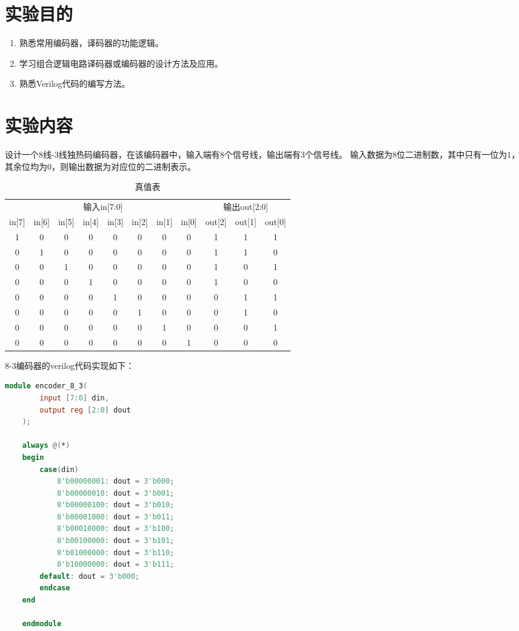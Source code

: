 \documentclass{experiment}
\begin{document}
	\makecover
	\section{实验目的}
		\begin{enumerate}
		\item 熟悉常用编码器，译码器的功能逻辑。
		\item 学习组合逻辑电路译码器或编码器的设计方法及应用。
		\item 熟悉Verilog代码的编写方法。
		\end{enumerate}
	\section{实验内容}
	
	设计一个8线-3线独热码编码器，在该编码器中，输入端有8个信号线，输出端有3个信号线。
	输入数据为8位二进制数，其中只有一位为1，其余位均为0，则输出数据为对应位的二进制表示。
	

	\begin{table}[htbp]
		\centering
		\caption{真值表}
		\begin{tabular}{cccccccc|ccc}
			\toprule
			\multicolumn{8}{c|}{输入in[7:0]} & \multicolumn{3}{c}{输出out[2:0]} \\
			\cmidrule{1-8}\cmidrule{9-11} in[7] & in[6] & in[5] & in[4] & in[3] & in[2] & in[1] & in[0] & out[2] & out[1] & out[0] \\
			\midrule
			1 & 0 & 0 & 0 & 0 & 0 & 0 & 0 & 1 & 1 & 1 \\
			0 & 1 & 0 & 0 & 0 & 0 & 0 & 0 & 1 & 1 & 0 \\
			0 & 0 & 1 & 0 & 0 & 0 & 0 & 0 & 1 & 0 & 1 \\
			0 & 0 & 0 & 1 & 0 & 0 & 0 & 0 & 1 & 0 & 0 \\
			0 & 0 & 0 & 0 & 1 & 0 & 0 & 0 & 0 & 1 & 1 \\
			0 & 0 & 0 & 0 & 0 & 1 & 0 & 0 & 0 & 1 & 0 \\
			0 & 0 & 0 & 0 & 0 & 0 & 1 & 0 & 0 & 0 & 1 \\
			0 & 0 & 0 & 0 & 0 & 0 & 0 & 1 & 0 & 0 & 0 \\
			\bottomrule
		\end{tabular}%
		\label{tab:addlabel}%
	\end{table}%

	8-3编码器的verilog代码实现如下：
\begin{lstlisting}[language=verilog]
	module encoder_8_3(
		input [7:0] din,
		output reg [2:0] dout
	);
	
	always @(*)
	begin
		case(din)
			8'b00000001: dout = 3'b000;
			8'b00000010: dout = 3'b001;
			8'b00000100: dout = 3'b010;
			8'b00001000: dout = 3'b011;
			8'b00010000: dout = 3'b100;
			8'b00100000: dout = 3'b101;
			8'b01000000: dout = 3'b110;
			8'b10000000: dout = 3'b111;
		default: dout = 3'b000;
		endcase
	end
	
	endmodule
\end{lstlisting}
\end{document}

